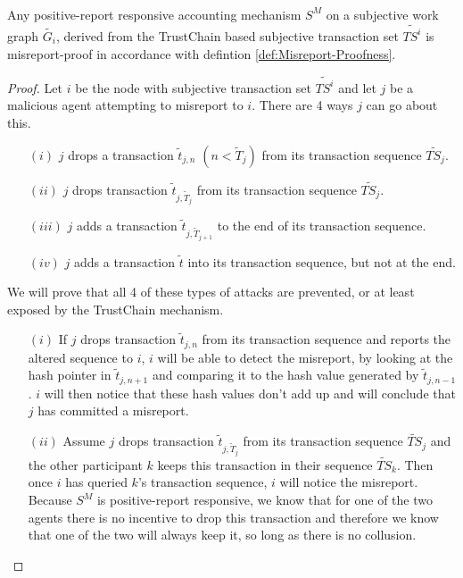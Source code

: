 \begin{theorem}[]\ \\
\label{th:Trustchain makes positive-report responsive accounting mechanisms misreport-proof}
\noindent{}Any positive-report responsive accounting mechanism $S^M$ on a subjective work graph $\tilde{G_i}$, derived from the TrustChain based subjective transaction set $\tilde{TS^i}$ is misreport-proof in accordance with defintion \ref{def:Misreport-Proofness}.
\end{theorem}
\begin{proof}
\noindent{}Let $i$ be the node with subjective transaction set $\tilde{TS^i}$ and let $j$ be a malicious agent attempting to misreport to $i$. There are 4 ways $j$ can go about this. 
\begin{itemize}
\item[$(i)$] $j$ drops a transaction $\tilde{t}_{j,n}$ $(n<\tilde{T}_j)$ from its transaction sequence $\tilde{TS_j}$.
\item[$(ii)$] $j$ drops transaction $\tilde{t}_{j,\tilde{T}_j}$ from its transaction sequence $\tilde{TS_j}$.
\item[$(iii)$] $j$ adds a transaction $\tilde{t}_{j,\tilde{T}_{j+1}}$ to the end of its transaction sequence. 
\item[$(iv)$] $j$ adds a transaction $\tilde{t}$ into its transaction sequence, but not at the end.
\end{itemize}
\noindent{}We will prove that all 4 of these types of attacks are prevented, or at least exposed by the TrustChain mechanism. \vspace{1em}\\

\begin{itemize}
\item[$(i)$] If $j$ drops transaction $\tilde{t}_{j,n}$ from its transaction sequence and reports the altered sequence to $i$, $i$ will be able to detect the misreport, by looking at the hash pointer in $\tilde{t}_{j,n+1}$ and comparing it to the hash value generated by $\tilde{t}_{j,n-1}$. $i$ will then notice that these hash values don't add up and will conclude that $j$ has committed a misreport.\vspace{1em}\\

\item[$(ii)$] Assume $j$ drops transaction $\tilde{t}_{j,\tilde{T}_j}$ from its transaction sequence $\tilde{TS}_j$ and the other participant $k$ keeps this transaction in their sequence $\tilde{TS}_k$. Then once $i$ has queried $k$'s transaction sequence, $i$ will notice the misreport. Because $S^M$ is positive-report responsive, we know that for one of the two agents there is no incentive to drop this transaction and therefore we know that one of the two will always keep it, so long as there is no collusion. \vspace{1em}\\


\end{itemize}
\end{proof}
